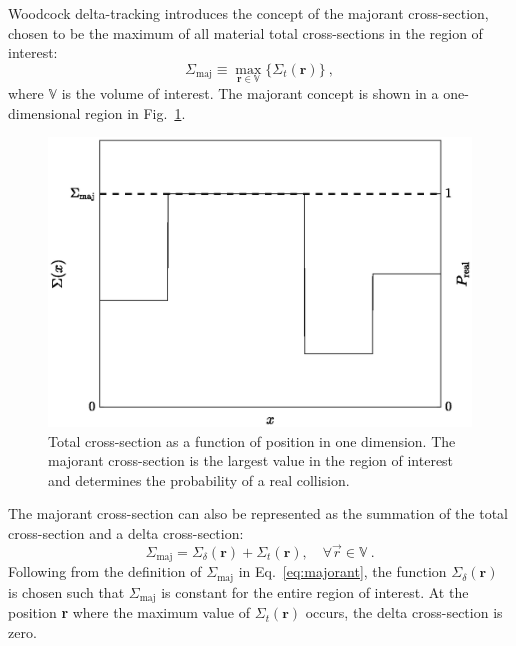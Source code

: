 Woodcock delta-tracking introduces the concept of the majorant
cross-section, chosen to be the maximum of all material total
cross-sections in the region of interest:
\begin{equation}
  \label{eq:majorant}
  \Sigma_\mathrm{maj} \equiv \max_{\mathbf{r} \in \mathbb{V}}\{\Sigma_t(\mathbf{r})\}\:,
\end{equation}
where $\mathbb{V}$ is the volume of interest. The majorant concept is shown in a
one-dimensional region in Fig.~\ref{fig:sigma_maj}.
\begin{figure}[hbt]
  \centering
  \includegraphics[scale=0.75]{images/sigma_maj}
  \caption{Total cross-section as a function of position in one
    dimension. The majorant cross-section is the largest value in the
    region of interest and determines the probability of a real collision.}
  \label{fig:sigma_maj}
\end{figure}

The majorant
cross-section can also be represented as the summation of the total
cross-section and a delta cross-section:
\begin{equation}
  \label{eq:majorant2}
  \Sigma_\mathrm{maj} = \Sigma_\delta(\mathbf{r}) +
  \Sigma_t(\mathbf{r}), \quad\forall \vec{r} \in \mathbb{V}\:.
\end{equation}
Following from the definition of $\Sigma_\mathrm{maj}$ in
Eq.~\eqref{eq:majorant}, the function $\Sigma_\delta(\mathbf{r})$ is
chosen such that $\Sigma_\mathrm{maj}$ is constant for the entire
region of interest. At the position \textbf{r} where the maximum value
of $\Sigma_t(\mathbf{r})$ occurs, the delta cross-section is zero.


